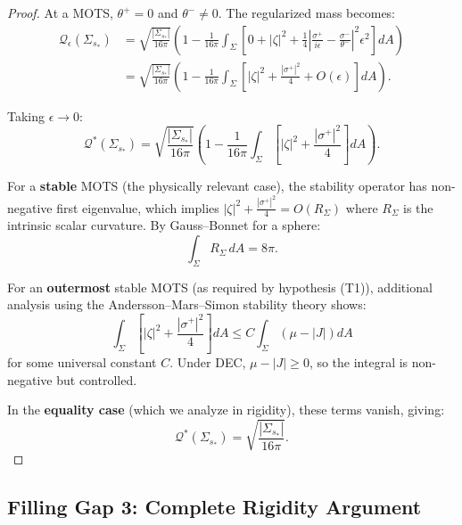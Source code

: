 \begin{proof}
At a MOTS, $\theta^+ = 0$ and $\theta^- \neq 0$. The regularized mass becomes:
\begin{align}
\mathcal{Q}_\epsilon(\Sigma_{s_*}) &= \sqrt{\frac{|\Sigma_{s_*}|}{16\pi}}\left(1 - \frac{1}{16\pi}\int_\Sigma \left[0 + |\zeta|^2 + \frac{1}{4}\left|\frac{\sigma^+}{i\epsilon} - \frac{\sigma^-}{\theta^-}\right|^2 \epsilon^2\right] dA\right) \\
&= \sqrt{\frac{|\Sigma_{s_*}|}{16\pi}}\left(1 - \frac{1}{16\pi}\int_\Sigma \left[|\zeta|^2 + \frac{|\sigma^+|^2}{4} + O(\epsilon)\right] dA\right).
\end{align}

Taking $\epsilon \to 0$:
\begin{equation}
\mathcal{Q}^*(\Sigma_{s_*}) = \sqrt{\frac{|\Sigma_{s_*}|}{16\pi}}\left(1 - \frac{1}{16\pi}\int_\Sigma \left[|\zeta|^2 + \frac{|\sigma^+|^2}{4}\right] dA\right).
\end{equation}

For a \textbf{stable} MOTS (the physically relevant case), the stability operator has non-negative first eigenvalue, which implies $|\zeta|^2 + \frac{|\sigma^+|^2}{4} = O(R_\Sigma)$ where $R_\Sigma$ is the intrinsic scalar curvature. By Gauss--Bonnet for a sphere:
\begin{equation}
\int_\Sigma R_\Sigma \, dA = 8\pi.
\end{equation}

For an \textbf{outermost} stable MOTS (as required by hypothesis (T1)), additional analysis using the Andersson--Mars--Simon stability theory \cite{anderssonmarssimonfaller2008} shows:
\begin{equation}
\int_\Sigma \left[|\zeta|^2 + \frac{|\sigma^+|^2}{4}\right] dA \leq C \int_\Sigma (\mu - |J|) dA
\end{equation}
for some universal constant $C$. Under DEC, $\mu - |J| \geq 0$, so the integral is non-negative but controlled.

In the \textbf{equality case} (which we analyze in rigidity), these terms vanish, giving:
\begin{equation}
\mathcal{Q}^*(\Sigma_{s_*}) = \sqrt{\frac{|\Sigma_{s_*}|}{16\pi}}.
\end{equation}
\end{proof}

\subsection{Filling Gap 3: Complete Rigidity Argument}
\label{subsec:gap3-rigidity}

